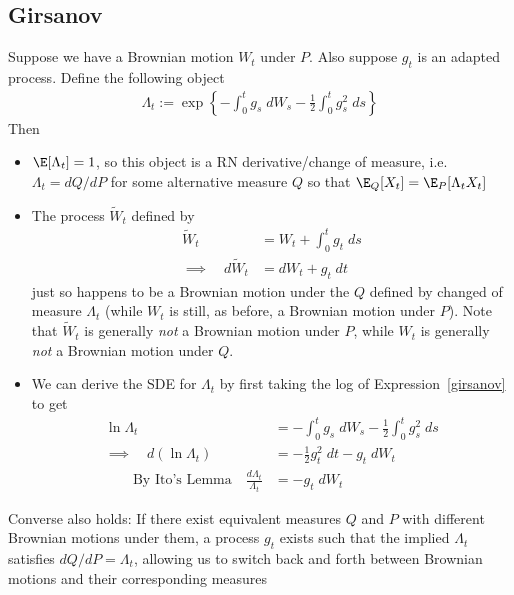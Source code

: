 \documentclass[12pt]{article}
\theoremstyle{plain}
\theoremstyle{definition}
\theoremstyle{remark}
\begin{document}
\clearpage
\subsection{Girsanov}

Suppose we have a Brownian motion $W_t$ under $P$.
Also suppose $g_t$ is an adapted process.
Define the following object
\begin{align}
  \Lambda_t
  :=
  \exp\left\{
    -\int_0^t g_s\;dW_s
    - \frac{1}{2} \int_0^t g_s^2 \;ds
  \right\}
  \label{girsanov}
\end{align}
Then
\begin{itemize}
  \item $\E[\Lambda_t]=1$, so this object is a RN derivative/change of
    measure, i.e.  $\Lambda_t=dQ/dP$ for some alternative measure $Q$ so
    that $\E_Q[X_t]=\E_P[\Lambda_t X_t]$

  \item
    The process $\tilde{W}_t$ defined by
    \begin{align*}
      \tilde{W}_t
      &= W_t +\int_0^t g_t\;ds
      \\
      \implies\quad
      d\tilde{W}_t
      &= dW_t + g_t\;dt
    \end{align*}
    just so happens to be a Brownian motion under the $Q$ defined by
    changed of measure $\Lambda_t$ (while $W_t$ is still, as before, a
    Brownian motion under $P$).
    Note that $\tilde{W}_t$ is generally \emph{not} a Brownian motion
    under $P$, while $W_t$ is generally \emph{not} a Brownian motion
    under $Q$.

  \item
    We can derive the SDE for $\Lambda_t$ by first taking the log of
    Expression~\ref{girsanov} to get
    \begin{align*}
      \ln \Lambda_t
      &=
      -\int_0^t g_s\;dW_s
      - \frac{1}{2} \int_0^t g_s^2 \;ds
      \\
      \implies\quad
      d(\ln \Lambda_t)
      &=
      - \frac{1}{2} g_t^2\;dt
      - g_t\;dW_t
      \\
      \qquad \text{By Ito's Lemma}\quad
      \frac{d\Lambda_t}{\Lambda_t} &= -g_t\;dW_t
    \end{align*}
\end{itemize}
Converse also holds:
If there exist equivalent measures $Q$ and $P$ with different Brownian
motions under them, a process $g_t$ exists such that the implied
$\Lambda_t$ satisfies $dQ/dP=\Lambda_t$, allowing us to switch back and
forth between Brownian motions and their corresponding measures
\end{document}
